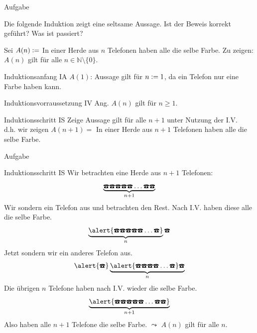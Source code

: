 {
	\begin{frame}[fragile]{Aufgabe}
		\begin{alertblock}{Die folgende Induktion zeigt eine seltsame Aussage.}
			Ist der Beweis korrekt geführt? Was ist passiert?
		\end{alertblock}
		Sei $A(n)\vcentcolon=$ In einer Herde aus $n$ Telefonen haben alle die selbe Farbe.
		Zu zeigen: $A(n)$ gilt für alle $n \in \mathbb{N} \setminus \{0\} $.
		\begin{alertblock}{Induktionsanfang IA}
			$A(1)$: Aussage gilt für $n\vcentcolon= 1$, da ein Telefon nur eine Farbe haben kann.
		\end{alertblock}
		\begin{alertblock}{Induktionsvorraussetzung IV}
			Ang. $A(n)$ gilt für $n\geq1$.
		\end{alertblock}
		\begin{alertblock}{Induktionsschritt IS}
			Zeige Aussage gilt für alle $n+1$ unter Nutzung der I.V.\\
			d.h. wir zeigen $A(n+1)=$ In einer Herde aus $n+1$ Telefonen haben alle die selbe Farbe.
		\end{alertblock}
	\end{frame}
	\begin{frame}[fragile]{Aufgabe}
		\footnotesize{
			\begin{alertblock}{Induktionsschritt IS}
				Wir betrachten eine Herde aus $n+1$ Telefonen:
				\[\underbrace{\text{\Telefon}\text{\Telefon}\text{\Telefon}\text{\Telefon}\text{\Telefon}\dots\text{\Telefon}\text{\Telefon}}_{n+1}\]
				Wir sondern ein Telefon aus und betrachten den Rest. Nach I.V. haben diese alle die selbe Farbe.
				\[\underbrace{\alert{\text{\Telefon}\text{\Telefon}\text{\Telefon}\text{\Telefon}\text{\Telefon}\dots\text{\Telefon}}}_{n}\text{\Telefon}\]
				Jetzt sondern wir ein anderes Telefon aus.
				\[\alert{\text{\Telefon}}\underbrace{\alert{\text{\Telefon}\text{\Telefon}\text{\Telefon}\text{\Telefon}\dots\text{\Telefon}}\text{\Telefon}}_{n}\]
				Die übrigen $n$ Telefone haben nach I.V. wieder die selbe Farbe.
				\[\underbrace{\alert{\text{\Telefon}\text{\Telefon}\text{\Telefon}\text{\Telefon}\text{\Telefon}\dots\text{\Telefon}\text{\Telefon}}}_{n+1}\]
				Also haben alle $n+1$ Telefone die selbe Farbe.
				$\leadsto$ $A(n)$ gilt für alle $n$.
			\end{alertblock}
		}
	\end{frame}
}

